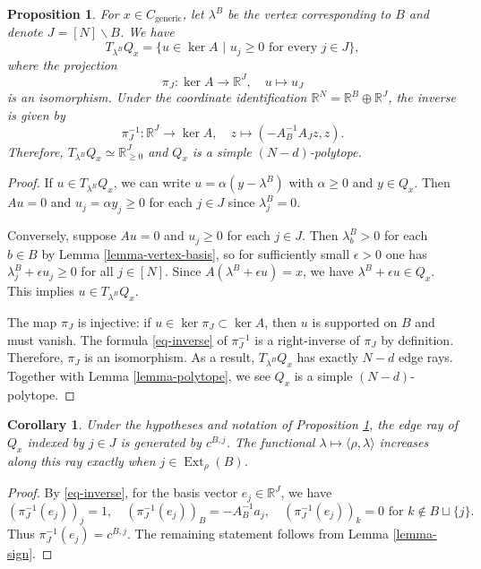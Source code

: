 \documentclass[12pt]{amsart}
\newtheorem{proposition}[theorem]{Proposition}
\newtheorem{corollary}[theorem]{Corollary}
\numberwithin{equation}{section}
\numberwithin{theorem}{section}
\newcommand{\op}{\operatorname}
\newcommand{\R}{\mathbb{R}}
\begin{document}
\begin{proposition}
  \label{prop-simple}
  For $x\in C_{\mathrm{generic}}$, let $\lambda^B$ be the vertex corresponding to $B$ and denote $J=[N]\backslash B$. We have
  \begin{equation}
    T_{\lambda^B}Q_x=\{u\in \op{ker}A\,\,|\,\, u_j\geq0 \text{ for every } j\in J\},
  \end{equation}
  where the projection
  \begin{equation*}
    \pi_J: \op{ker}A\to \R^J,\quad u\mapsto u_J
  \end{equation*}
  is an isomorphism.
  Under the coordinate identification $\R^N=\R^B\oplus\R^J$, the inverse is given by
  \begin{equation}
    \label{eq-inverse}
    \pi^{-1}_J: \R^J\to \op{ker}A,\quad z\mapsto (-A_B^{-1}A_J z,z).
  \end{equation}
  Therefore, $T_{\lambda^B}Q_x\simeq \R^J_{\geq0}$ and $Q_x$ is a simple $(N-d)$-polytope.
\end{proposition}
\begin{proof}
  If $u\in T_{\lambda^B} Q_x$, we can write $u=\alpha(y-\lambda^B)$ with $\alpha\geq0$ and $y\in Q_x$. Then $Au=0$ and $u_j=\alpha y_j\geq0$ for each $j\in J$ since $\lambda^B_j=0$.

  Conversely, suppose $Au=0$ and $u_j\geq0$ for each $j\in J$. Then $\lambda^B_b>0$ for each $b\in B$ by Lemma \ref{lemma-vertex-basis}, so for sufficiently small $\epsilon>0$ one has $\lambda^B_j+\epsilon u_j\geq 0$ for all $j\in [N]$.
  Since $A(\lambda^B+\epsilon u)=x$, we have $\lambda^B+\epsilon u\in Q_x$. This implies $u\in T_{\lambda^B}Q_x$.

  The map $\pi_J$ is injective: if $u\in\op{ker}\pi_J\subset \op{ker}A$, then $u$ is supported on $B$ and must vanish.
  The formula \eqref{eq-inverse} of $\pi_J^{-1}$ is a right-inverse of $\pi_J$ by definition. Therefore, $\pi_J$ is an isomorphism.
  As a result, $T_{\lambda^B}Q_x$ has exactly $N-d$ edge rays. Together with Lemma \ref{lemma-polytope}, we see $Q_x$ is a simple $(N-d)$-polytope.
\end{proof}


\begin{corollary}
  \label{cor-ext}
  Under the hypotheses and notation of Proposition \ref{prop-simple}, the edge ray of $Q_x$ indexed by $j\in J$ is generated by $c^{B,j}$. The functional $\lambda\mapsto\langle\rho,\lambda\rangle$ increases along this ray exactly when $j\in \op{Ext}_\rho(B)$.
\end{corollary}
\begin{proof}
  By \eqref{eq-inverse}, for the basis vector $e_j\in \R^J$, we have
  \begin{equation*}
    (\pi_J^{-1}(e_j))_j=1,\quad (\pi_J^{-1}(e_j))_B=-A_B^{-1}a_j,\quad (\pi_J^{-1}(e_j))_k=0\text{  for  }k\notin B\sqcup\{j\}.
  \end{equation*}
  Thus $\pi_J^{-1}(e_j)=c^{B,j}$. The remaining statement follows from Lemma \ref{lemma-sign}.
\end{proof}
\end{document}
